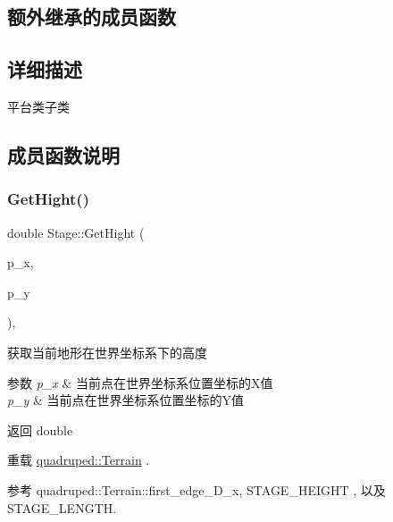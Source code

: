 \subsection*{额外继承的成员函数}


\subsection{详细描述}
平台类子类 

\subsection{成员函数说明}
\mbox{\label{classquadruped_1_1Stage_a57211e7a49be8e5413b4edb9e5051547}} 
\subsubsection{\texorpdfstring{Get\+Hight()}{GetHight()}}
{\footnotesize\ttfamily double Stage\+::\+Get\+Hight (\begin{DoxyParamCaption}\item[{double}]{p\+\_\+x,  }\item[{double}]{p\+\_\+y }\end{DoxyParamCaption})\hspace{0.3cm}{\ttfamily [override]}, {\ttfamily [virtual]}}



获取当前地形在世界坐标系下的高度 


\begin{DoxyParams}{参数}
{\em p\+\_\+x} & 当前点在世界坐标系位置坐标的\+X值 \\
\hline
{\em p\+\_\+y} & 当前点在世界坐标系位置坐标的\+Y值 \\
\hline
\end{DoxyParams}
\begin{DoxyReturn}{返回}
double 
\end{DoxyReturn}


重载 \hyperlink{classquadruped_1_1Terrain}{quadruped\+::\+Terrain} .



参考 quadruped\+::\+Terrain\+::first\+\_\+edge\+\_\+\+D\+\_\+x, S\+T\+A\+G\+E\+\_\+\+H\+E\+I\+G\+HT , 以及 S\+T\+A\+G\+E\+\_\+\+L\+E\+N\+G\+TH.

\mbox{\label{classquadruped_1_1Stage_aefa2ad3075cce6c230b9a2c3a7de9079}} 
